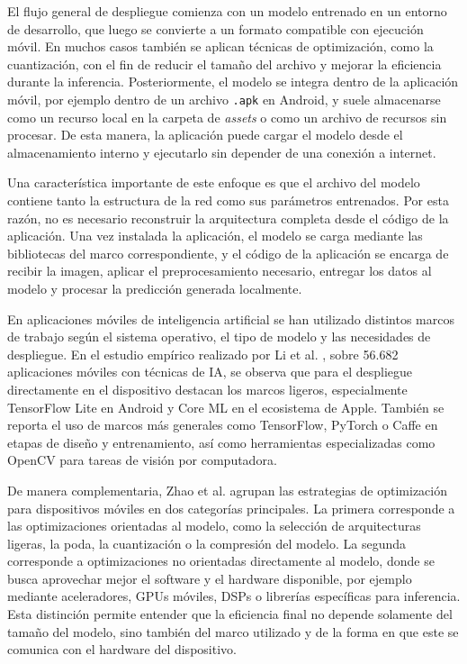 El flujo general de despliegue comienza con un modelo entrenado en un entorno de desarrollo, que luego se convierte a un formato
compatible con ejecución móvil. En muchos casos también se aplican técnicas de optimización, como la cuantización, con el fin de reducir
el tamaño del archivo y mejorar la eficiencia durante la inferencia. Posteriormente, el modelo se integra dentro de la aplicación móvil,
por ejemplo dentro de un archivo \texttt{.apk} en Android, y suele almacenarse como un recurso local en la carpeta de \textit{assets} o
como un archivo de recursos sin procesar. De esta manera, la aplicación puede cargar el modelo desde el almacenamiento interno y ejecutarlo
sin depender de una conexión a internet.

Una característica importante de este enfoque es que el archivo del modelo contiene tanto la estructura de la red como sus parámetros
entrenados. Por esta razón, no es necesario reconstruir la arquitectura completa desde el código de la aplicación. Una vez instalada la
aplicación, el modelo se carga mediante las bibliotecas del marco correspondiente, y el código de la aplicación se encarga de recibir
la imagen, aplicar el preprocesamiento necesario, entregar los datos al modelo y procesar la predicción generada localmente.

En aplicaciones móviles de inteligencia artificial se han utilizado distintos marcos de trabajo según el sistema operativo, el tipo de
modelo y las necesidades de despliegue. En el estudio empírico realizado por Li et al. \cite{li2024empirical}, sobre 56.682 aplicaciones
móviles con técnicas de IA, se observa que para el despliegue directamente en el dispositivo destacan los marcos ligeros, especialmente
TensorFlow Lite en Android y Core ML en el ecosistema de Apple. También se reporta el uso de marcos más generales como TensorFlow,
PyTorch o Caffe en etapas de diseño y entrenamiento, así como herramientas especializadas como OpenCV para tareas de visión por
computadora.

De manera complementaria, Zhao et al. \cite{zhao2022survey} agrupan las estrategias de optimización para dispositivos móviles en dos
categorías principales. La primera corresponde a las optimizaciones orientadas al modelo, como la selección de arquitecturas ligeras, la
poda, la cuantización o la compresión del modelo. La segunda corresponde a optimizaciones no orientadas directamente al modelo, donde se
busca aprovechar mejor el software y el hardware disponible, por ejemplo mediante aceleradores, GPUs móviles, DSPs o librerías específicas
para inferencia. Esta distinción permite entender que la eficiencia final no depende solamente del tamaño del modelo, sino también del
marco utilizado y de la forma en que este se comunica con el hardware del dispositivo.

